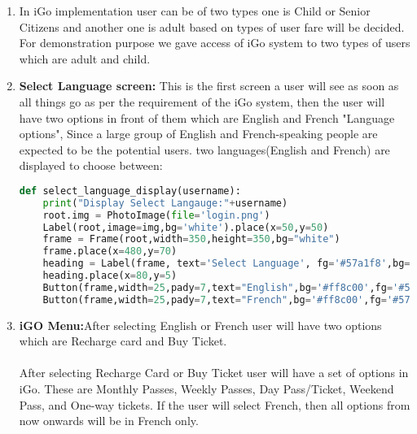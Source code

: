 \documentclass[a4paper,12pt]{report}
\begin{document}
\begin{enumerate}
\item	In iGo implementation user can be of two types one is Child or Senior Citizens and another one is adult based on types of user fare will be decided. For demonstration purpose we gave access of iGo system to two types of users which are adult and child. 

\item \textbf{Select Language screen:} This is the first screen a user will see as soon as all things go as per the requirement of the iGo system, then the user will have two options in front of them which are English and French "Language options", Since a large group of English and French-speaking people are expected to be the potential users. two languages(English and French) are displayed to choose between:\\
\begin{lstlisting}[language=Python]
def select_language_display(username):
    print("Display Select Langauge:"+username)
    root.img = PhotoImage(file='login.png')
    Label(root,image=img,bg='white').place(x=50,y=50)
    frame = Frame(root,width=350,height=350,bg="white")
    frame.place(x=480,y=70)
    heading = Label(frame, text='Select Language', fg='#57a1f8',bg='white',font=('Microsoft YaHei UI Light',23,'bold'))
    heading.place(x=80,y=5)
    Button(frame,width=25,pady=7,text="English",bg='#ff8c00',fg='#57a1f8',font=('Microsoft YaHei UI Light',15,'bold','italic'),border=0,highlightbackground="#ff8c00",command=lambda: English_Language(username)).place(x=25,y=107)
    Button(frame,width=25,pady=7,text="French",bg='#ff8c00',fg='#57a1f8',font=('Microsoft YaHei UI Light',15,'bold','italic'),border=0,highlightbackground="#ff8c00",command=lambda: French_Language(username)).place(x=30,y=170)
\end{lstlisting}
\item \textbf{iGO Menu:}After selecting English or French user will have two options which are Recharge card and Buy Ticket.\\\\
After selecting Recharge Card or Buy Ticket user will have a set of options in iGo. These are Monthly Passes, Weekly Passes, Day Pass/Ticket, Weekend Pass, and One-way tickets. If the user will select French, then all options from now onwards will be in French only.\\\\


\end{enumerate}
\end{document}
